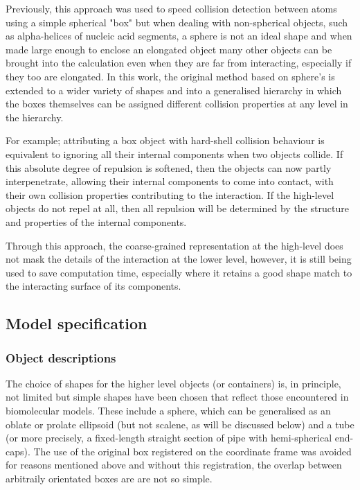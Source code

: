Previously, this approach was used to speed collision detection
between atoms using a simple spherical "box" but when dealing with non-spherical objects,
such as alpha-helices of nucleic acid segments, a sphere is not an ideal shape and
when made large enough to enclose an elongated object many other objects can be
brought into the calculation even when they are far from interacting, especially if
they too are elongated.   In this work, the original method based on sphere's is
extended to a wider variety of shapes and into a generalised hierarchy in which the
boxes themselves can be assigned different collision properties at any level in the
hierarchy. 

For example; attributing a box object with hard-shell collision behaviour is equivalent to
ignoring all their internal components when two objects collide.    If this absolute
degree of repulsion is softened, then the objects can now partly interpenetrate,
allowing their internal components to come into contact, with their own collision
properties contributing to the interaction.   If the high-level objects do not
repel at all, then all repulsion will be determined by the structure and properties of
the internal components.

Through this approach, the coarse-grained representation at the high-level does not
mask the details of the interaction at the lower level, however, it is still being
used to save computation time, especially where it retains a good shape match to the
interacting surface of its components.


\subsection{Model specification}

\subsubsection{Object descriptions}
 
The choice of shapes for the higher level objects (or containers) is, in principle, not
limited but simple shapes have been chosen that reflect those encountered in biomolecular
models.   These include a sphere, which can be generalised as an oblate or prolate ellipsoid
(but not scalene, as will be discussed below) and a tube (or more precisely, a fixed-length
straight section of pipe with hemi-spherical end-caps).   The use of the original box
registered on the coordinate frame was avoided for reasons mentioned above and without
this registration, the overlap between arbitraily orientated boxes are are not so simple.

